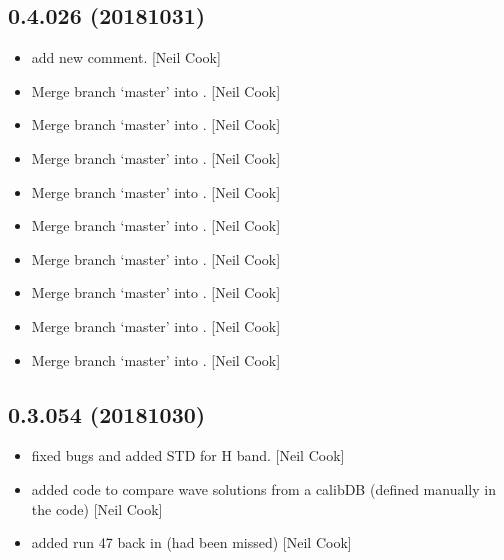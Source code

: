 \documentclass[a4paper,10pt,english]{report}
\begin{document}
\subsection{0.4.026 (2018\sphinxhyphen{}10\sphinxhyphen{}31)}
\label{\detokenize{misc/changelog:id295}}\begin{itemize}
\item {} 
 \sphinxhyphen{} add new comment. {[}Neil Cook{]}

\item {} 
Merge branch ‘master’ into . {[}Neil Cook{]}

\item {} 
Merge branch ‘master’ into . {[}Neil Cook{]}

\item {} 
Merge branch ‘master’ into . {[}Neil Cook{]}

\item {} 
Merge branch ‘master’ into . {[}Neil Cook{]}

\item {} 
Merge branch ‘master’ into . {[}Neil Cook{]}

\item {} 
Merge branch ‘master’ into . {[}Neil Cook{]}

\item {} 
Merge branch ‘master’ into . {[}Neil Cook{]}

\item {} 
Merge branch ‘master’ into . {[}Neil Cook{]}

\item {} 
Merge branch ‘master’ into . {[}Neil Cook{]}

\end{itemize}


\subsection{0.3.054 (2018\sphinxhyphen{}10\sphinxhyphen{}30)}
\label{\detokenize{misc/changelog:id296}}\begin{itemize}
\item {} 
 \sphinxhyphen{} fixed bugs and added STD for H band. {[}Neil Cook{]}

\item {} 
 \sphinxhyphen{} added code to compare wave solutions from a calibDB
(defined manually in the code) {[}Neil Cook{]}

\item {} 
 \sphinxhyphen{} added run 47 back in (had been missed) {[}Neil Cook{]}

\end{itemize}
\end{document}
